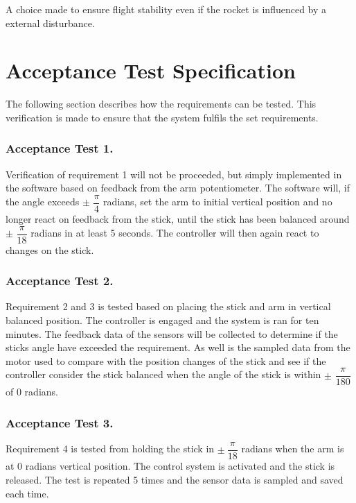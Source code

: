 \forceindent  A choice made to ensure flight stability even if the rocket is influenced by a external disturbance.

\section{Acceptance Test Specification}	
The following section describes how the requirements can be tested. This verification is made to ensure that the system fulfils the set requirements.

\subsubsection*{Acceptance Test 1.}

\forceindent Verification of requirement 1 will not be proceeded, but simply implemented in the software based on feedback from the arm potentiometer. The software will, if the angle exceeds $\pm$ $\dfrac{\pi}{4}$ radians, set the arm to initial vertical position and no longer react on feedback from the stick, until the stick has been balanced around $\pm$ $\dfrac{\pi}{18}$ radians in at least 5 seconds. The controller will then again react to changes on the stick.    

\subsubsection*{Acceptance Test 2.}

\forceindent Requirement 2 and 3 is tested based on placing the stick and arm in vertical balanced position. The controller is engaged and the system is ran for ten minutes. The feedback data of the sensors will be collected to determine if the sticks angle have exceeded the requirement. As well is the sampled data from the motor used to compare with the position changes of the stick and see if the controller consider the stick balanced when the angle of the stick is within $\pm$ $\dfrac{\pi}{180}$ of 0 radians. 

\subsubsection*{Acceptance Test 3.}
\forceindent Requirement 4 is tested from holding the stick in $\pm\ \dfrac{\pi}{18}$ radians when the arm is at 0 radians vertical position. The control system is activated and the stick is released. The test is repeated 5 times and the sensor data is sampled and saved each time.   

